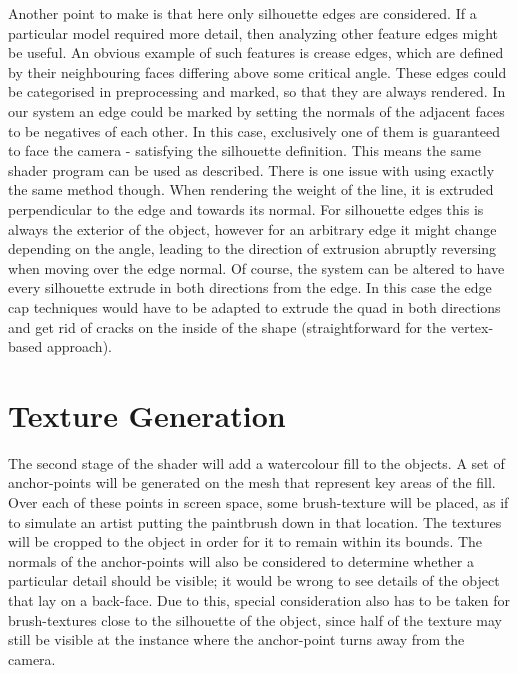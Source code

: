 \documentclass[a4paper,10pt]{article}
\begin{document}
Another point to make is that here only silhouette edges are considered. If a particular model required more detail, then analyzing other feature edges might be useful. An obvious example of such features is crease edges, which are defined by their neighbouring faces differing above some critical angle. These edges could be categorised in preprocessing and marked, so that they are always rendered. In our system an edge could be marked by setting the normals of the adjacent faces to be negatives of each other. In this case, exclusively one of them is guaranteed to face the camera - satisfying the silhouette definition. This means the same shader program can be used as described. There is one issue with using exactly the same method though. When rendering the weight of the line, it is extruded perpendicular to the edge and towards its normal. For silhouette edges this is always the exterior of the object, however for an arbitrary edge it might change depending on the angle, leading to the direction of extrusion abruptly reversing when moving over the edge normal. Of course, the system can be altered to have every silhouette extrude in both directions from the edge. In this case the edge cap techniques would have to be adapted to extrude the quad in both directions and get rid of cracks on the inside of the shape (straightforward for the vertex-based approach).



\section{Texture Generation}

The second stage of the shader will add a watercolour fill to the objects. A set of anchor-points will be generated on the mesh that represent key areas of the fill. Over each of these points in screen space, some brush-texture will be placed, as if to simulate an artist putting the paintbrush down in that location. The textures will be cropped to the object in order for it to remain within its bounds. The normals of the anchor-points will also be considered to determine whether a particular detail should be visible; it would be wrong to see details of the object that lay on a back-face. Due to this, special consideration also has to be taken for brush-textures close to the silhouette of the object, since half of the texture may still be visible at the instance where the anchor-point turns away from the camera.
\end{document}
